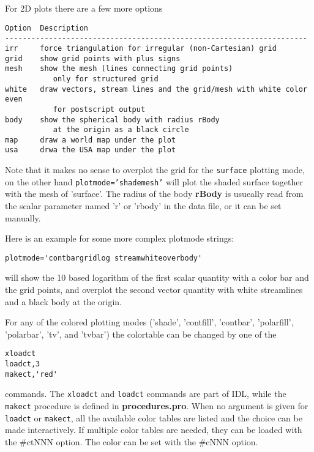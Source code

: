 \documentclass{article}
\begin{document}
For 2D plots there are a few more options
\begin{verbatim}
Option  Description
---------------------------------------------------------------------
irr     force triangulation for irregular (non-Cartesian) grid
grid    show grid points with plus signs
mesh    show the mesh (lines connecting grid points) 
           only for structured grid
white   draw vectors, stream lines and the grid/mesh with white color even 
           for postscript output
body    show the spherical body with radius rBody 
           at the origin as a black circle
map     draw a world map under the plot
usa     drwa the USA map under the plot
\end{verbatim}
   Note that it makes no sense to overplot the grid for the 
   {\tt surface} plotting mode, on the other hand {\tt plotmode='shademesh'}
   will plot the shaded surface together with the mesh of 'surface'.
   The radius of the body {\bf rBody} is usueally read from the 
   scalar parameter named 'r' or 'rbody' in the data file, or it can be set
   manually.

   Here is an example for some more complex plotmode strings:
\begin{verbatim}
plotmode='contbargridlog streamwhiteoverbody'
\end{verbatim} 
   will show the 10 based logarithm of the first scalar quantity with 
   a color bar and the grid points, 
   and overplot the second vector quantity with white streamlines
   and a black body at the origin.

   For any of the colored plotting modes ('shade', 'contfill', 'contbar', 
   'polarfill', 'polarbar', 'tv', and 'tvbar') the colortable can be 
   changed by one of the 
\begin{verbatim}
xloadct
loadct,3
makect,'red'
\end{verbatim}
   commands. The {\tt xloadct} and {\tt loadct} commands are part of IDL, while
   the {\tt makect} procedure is defined in {\bf procedures.pro}.
   When no argument is given for {\tt loadct} or {\tt makect}, 
   all the available color tables are listed
   and the choice can be made interactively.
   If multiple color tables are needed, they can be loaded with the \#ctNNN
   option. The color can be set with the \#cNNN option. 
\end{document}
